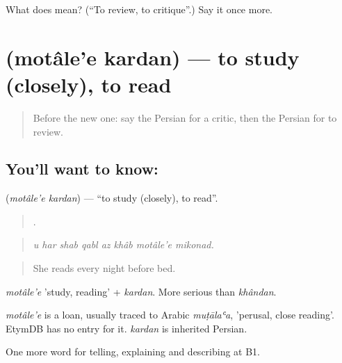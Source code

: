 \begin{tcolorbox}[breakable,colback=teal!4,colframe=teal!35!black,title={Before you move on}]
What does   mean? (\textquotedblleft{}To review, to critique\textquotedblright{}.) Say it once more.
\end{tcolorbox}
\section[\texorpdfstring{\fa{مطالعه} \fa{کردن} (motâle'e kardan)}{مطالعه کردن (motâle'e kardan)}]{  (motâle'e kardan) — to study (closely), to read}

\label{lesson:FA-C529-motalee-kardan}



\begin{quote}
Before the new one: say the Persian for a critic, then the Persian for to review.
\end{quote}

\subsection*{You'll want to know:  }
\textbf{ } (\emph{motâle'e kardan}) — \textquotedblleft{}to study (closely), to read\textquotedblright{}.

\begin{quote}
       .
\end{quote}

\begin{quote}
\emph{u har shab qabl az khâb motâle'e mikonad.}
\end{quote}

\begin{quote}
She reads every night before bed.
\end{quote}

\emph{motâle'e} 'study, reading' + \emph{kardan}. More serious than \emph{khândan}.

\begin{cousinweb}
\emph{motâle'e} is a loan, usually traced to Arabic \emph{muṭālaʿa}, 'perusal, close reading'. EtymDB has no entry for it. \emph{kardan} is inherited Persian.
\end{cousinweb}

\begin{grammarlens}[title={What you've built}]
One more word for telling, explaining and describing at B1.
\end{grammarlens}

